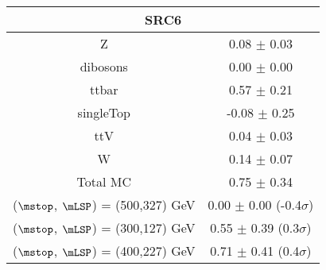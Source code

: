 \begin{tabular}{c|c}
\hline\hline
\multicolumn{2}{c}{\bf SRC6 } \\ \hline 
Z & 0.08 $\pm$ 0.03 \\
dibosons & 0.00 $\pm$ 0.00 \\
ttbar & 0.57 $\pm$ 0.21 \\
singleTop & -0.08 $\pm$ 0.25 \\
ttV & 0.04 $\pm$ 0.03 \\
W & 0.14 $\pm$ 0.07 \\
\hline
Total MC & 0.75 $\pm$ 0.34 \\
\hline
 ($\mstop$, $\mLSP$) = (500,327) GeV & 0.00 $\pm$ 0.00 (-0.4$\sigma$) \\
\hline
 ($\mstop$, $\mLSP$) = (300,127) GeV & 0.55 $\pm$ 0.39 (0.3$\sigma$) \\
\hline
 ($\mstop$, $\mLSP$) = (400,227) GeV & 0.71 $\pm$ 0.41 (0.4$\sigma$) \\
\hline\hline
\end{tabular}
